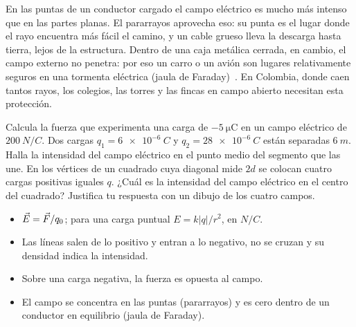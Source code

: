 \documentclass[11pt]{article}
\begin{document}
\begin{aplicacion}
En las puntas de un conductor cargado el campo eléctrico es mucho más intenso
que en las partes planas. El pararrayos aprovecha eso: su punta es el lugar
donde el rayo encuentra más fácil el camino, y un cable grueso lleva la
descarga hasta tierra, lejos de la estructura. Dentro de una caja metálica
cerrada, en cambio, el campo externo no penetra: por eso un carro o un avión
son lugares relativamente seguros en una tormenta eléctrica (jaula de
Faraday)~\cite{serway}. En Colombia, donde caen tantos rayos, los colegios,
las torres y las fincas en campo abierto necesitan esta protección.
\end{aplicacion}

\begin{preguntas}
\pregunta Calcula la fuerza que experimenta una carga de
$\qty{-5}{\micro\coulomb}$ en un campo eléctrico de $\qty{200}{N/C}$.
\espacio{2.5cm}
\pregunta Dos cargas $q_1 = \qty{6e-6}{C}$ y $q_2 = \qty{28e-6}{C}$ están
separadas $\qty{6}{m}$. Halla la intensidad del campo eléctrico en el punto
medio del segmento que las une.
\espacio{3cm}
\pregunta En los vértices de un cuadrado cuya diagonal mide $2d$ se colocan
cuatro cargas positivas iguales $q$. ¿Cuál es la intensidad del campo
eléctrico en el centro del cuadrado? Justifica tu respuesta con un dibujo de
los cuatro campos.
\espacio{2.5cm}
\end{preguntas}

\begin{resumen}
\begin{itemize}
  \item $\vec{E} = \vec{F}/q_0$; para una carga puntual $E = k|q|/r^{2}$, en
        $\unit{N/C}$.
  \item Las líneas salen de lo positivo y entran a lo negativo, no se cruzan y
        su densidad indica la intensidad.
  \item Sobre una carga negativa, la fuerza es opuesta al campo.
  \item El campo se concentra en las puntas (pararrayos) y es cero dentro de un
        conductor en equilibrio (jaula de Faraday).
\end{itemize}
\end{resumen}

\end{document}
